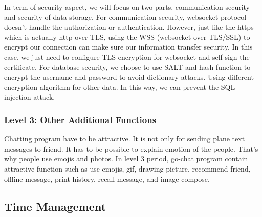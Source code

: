 \documentclass[a4paper]{article}
\begin{document}
In term of security aspect, we will focus on two parts, communication security and security of data storage. For communication security, websocket protocol doesn’t handle the authorization or authentication. However, just like the https which is actually http over TLS, using the WSS (websocket over TLS/SSL) to encrypt our connection can make sure our information transfer security. In this case, we just need to configure TLS encryption for websocket and self-sign the certificate. For database security, we choose to use SALT and hash function to encrypt the username and password to avoid dictionary attacks. Using different encryption algorithm for other data. In this way, we can prevent the SQL injection attack.

\subsubsection{Level 3: Other Additional Functions}

Chatting program have to be attractive. It is not only for sending plane text messages to friend. It has to be possible to explain emotion of the people. That's why people use emojis and photos. In level 3 period, go-chat program contain attractive function such as use emojis, gif, drawing picture, recommend friend, offline message, print history, recall message, and image compose.

\subsection{Time Management}

\end{document}
